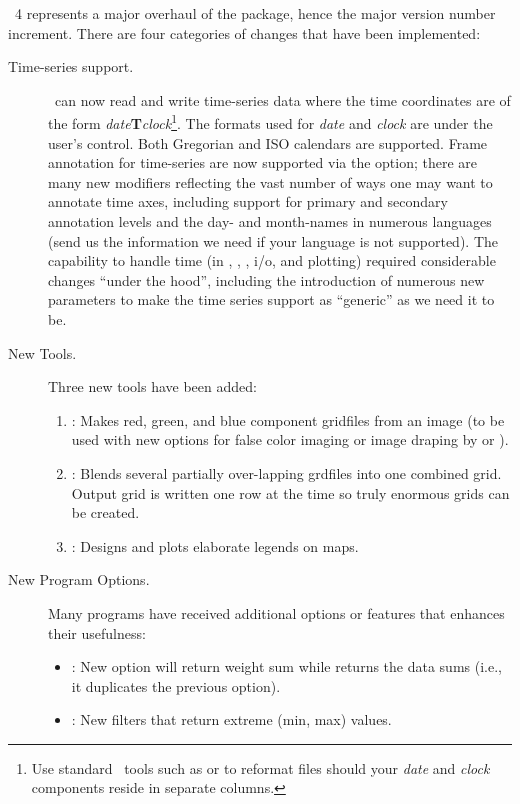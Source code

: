 \GMT\ 4 represents a major overhaul of the package, hence the major version number increment.  There are four
categories of changes that have been implemented:
\begin{description}
\item [Time-series support.]  \GMT\ can now read and write time-series data where
the time coordinates are of the form {\it date}{\bf T}{\it clock}\footnote{Use standard
\UNIX\ tools such as  or  to reformat files should
your {\it date} and {\it clock} components reside in separate columns.}.  The formats
used for {\it date} and {\it clock} are under the user's control.  Both Gregorian
and ISO calendars are supported.  Frame annotation for time-series are now supported
via the  option; there are many new modifiers reflecting the vast number of
ways one may want to annotate time axes, including support for primary and secondary
annotation levels and the day- and month-names in numerous languages (send us the information
we need if your language is not supported).  The capability to handle time (in ,
, , i/o, and plotting) required considerable changes ``under the hood'',
including the introduction of numerous new  parameters to make
the time series support as ``generic'' as we need it to be.
\item [New Tools.]  Three new tools have been added:
\begin{enumerate}
\item {}: Makes red, green, and blue component gridfiles from an image (to be
used with new options for false color imaging or image draping by  or ).
\item {}: Blends several partially over-lapping grdfiles into one combined grid.  Output
grid is written one row at the time so truly enormous grids can be created.
\item {}: Designs and plots elaborate legends on maps.
\end{enumerate}
\item [New Program Options.]  Many programs have received additional options or
features that enhances their usefulness:
\begin{itemize}
\item {}:	New option  will return weight sum while  returns
the data sums (i.e., it duplicates the previous  option).
\item {}:	New filters  that return extreme (min, max) values.

\end{itemize}
\end{description}
